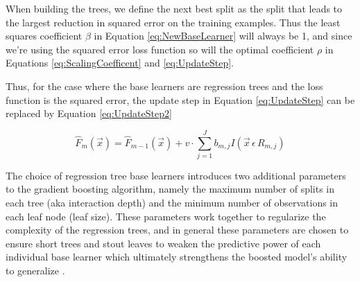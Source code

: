 \documentclass[9pt, conference]{IEEEtran}
\begin{document}
When building the trees, we define the next best split as the split that leads to the largest reduction in squared error on the training examples. Thus the least squares coefficient \(\beta\) in Equation \ref{eq:NewBaseLearner} will always be 1, and since we're using the squared error loss function so will the optimal coefficient \(\rho\) in Equations \ref{eq:ScalingCoefficent} and \ref{eq:UpdateStep}. 


Thus, for the case where the base learners are regression trees and the loss function is the squared error, the update step in Equation \ref{eq:UpdateStep} can be replaced by Equation \ref{eq:UpdateStep2}

\begin{equation}
\hat{F}_m(\vec{x}) = \hat{F}_{m-1}(\vec{x}) + v  \cdot \sum_{j=1}^{J}b_{m,j}I(\vec{x} \, \epsilon \, R_{m,j})
\label{eq:UpdateStep2}
\end{equation}

The choice of regression tree base learners introduces two additional parameters to the gradient boosting algorithm, namely the maximum number of splits in each tree (aka interaction depth) and the minimum number of observations in each leaf node (leaf size). These parameters work together to regularize the complexity of the regression trees, and in general these parameters are chosen to ensure short trees and stout leaves to weaken the predictive power of each individual base learner which ultimately strengthens the boosted model's ability to generalize \cite{ecological}. 
\end{document}
